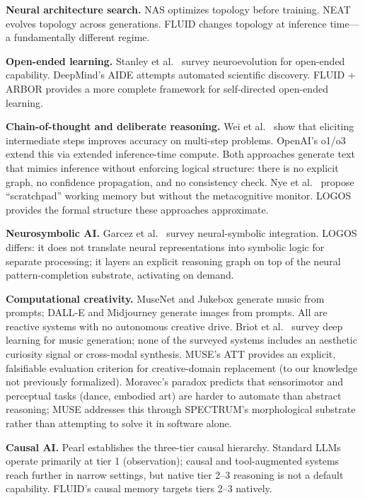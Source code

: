\documentclass[12pt]{article}
\begin{document}
\textbf{Neural architecture search.} NAS \cite{zoph2017} optimizes topology before training. NEAT \cite{stanley2002} evolves topology across generations. FLUID changes topology at inference time---a fundamentally different regime.

\textbf{Open-ended learning.} Stanley et al.\ \cite{stanley2019} survey neuroevolution for open-ended capability. DeepMind's AIDE \cite{lu2024} attempts automated scientific discovery. FLUID + ARBOR provides a more complete framework for self-directed open-ended learning.

\textbf{Chain-of-thought and deliberate reasoning.} Wei et al.\ \cite{wei2022} show that eliciting intermediate steps improves accuracy on multi-step problems. OpenAI's o1/o3 extend this via extended inference-time compute. Both approaches generate text that mimics inference without enforcing logical structure: there is no explicit graph, no confidence propagation, and no consistency check. Nye et al.\ \cite{nye2021} propose ``scratchpad'' working memory but without the metacognitive monitor. LOGOS provides the formal structure these approaches approximate.

\textbf{Neurosymbolic AI.} Garcez et al.\ \cite{garcez2022} survey neural-symbolic integration. LOGOS differs: it does not translate neural representations into symbolic logic for separate processing; it layers an explicit reasoning graph on top of the neural pattern-completion substrate, activating on demand.

\textbf{Computational creativity.} MuseNet \cite{payne2019} and Jukebox \cite{dhariwal2020} generate music from prompts; DALL-E \cite{ramesh2022} and Midjourney generate images from prompts. All are reactive systems with no autonomous creative drive. Briot et al.\ \cite{briot2020} survey deep learning for music generation; none of the surveyed systems includes an aesthetic curiosity signal or cross-modal synthesis. MUSE's ATT provides an explicit, falsifiable evaluation criterion for creative-domain replacement (to our knowledge not previously formalized). Moravec's paradox \cite{moravec1988} predicts that sensorimotor and perceptual tasks (dance, embodied art) are harder to automate than abstract reasoning; MUSE addresses this through SPECTRUM's morphological substrate rather than attempting to solve it in software alone.

\textbf{Causal AI.} Pearl \cite{pearl2009} establishes the three-tier causal hierarchy. Standard LLMs operate primarily at tier 1 (observation); causal and tool-augmented systems reach further in narrow settings, but native tier 2--3 reasoning is not a default capability. FLUID's causal memory targets tiers 2--3 natively.
\end{document}
